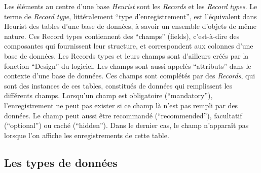 Les éléments au centre d'une base \emph{Heurist} sont les \emph{Records} et les \emph{Record types}. Le terme de \emph{Record type}, littéralement \enquote{type d'enregistrement}, est l'équivalent dans Heurist des tables d'une base de données, à savoir un ensemble d'objets de même nature. Ces Record types contiennent des \enquote{champs} (fields), c'est-à-dire des composantes qui fournissent leur structure, et correspondent aux colonnes d'une base de données. Les Records types et leurs champs sont d'ailleurs créés par la fonction \enquote{Design} du logiciel. Les champs sont aussi appelés \enquote{attributs} dans le contexte d'une base de données. Ces champs sont complétés par des \emph{Records}, qui sont des instances de ces tables, constitués de données qui remplissent les différents champs. Lorsqu'un champ est obligatoire (\enquote{mandatory}), l'enregistrement ne peut pas exister si ce champ là n'est pas rempli par des données. Le champ peut aussi être recommandé (\enquote{recommended}), facultatif (\enquote{optional}) ou caché (\enquote{hidden}). Dans le dernier cas, le champ n'apparaît pas lorsque l'on affiche les enregistrements de cette table. 

\subsection{Les types de données}
\label{types donnees}

